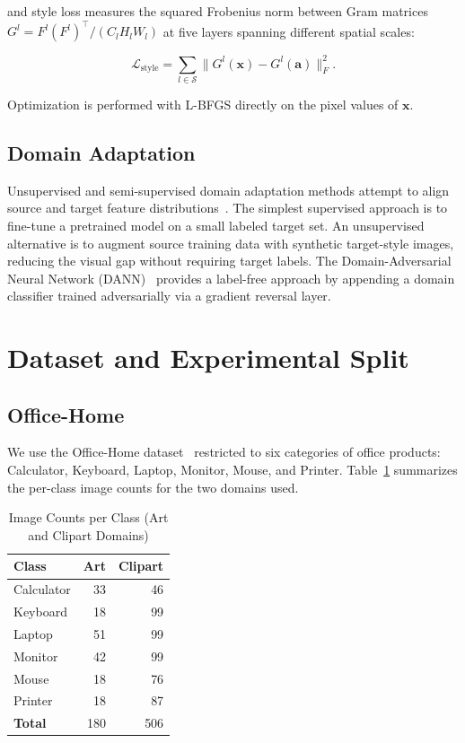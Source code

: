 \documentclass[conference]{IEEEtran}
\begin{document}
and style loss measures the squared Frobenius norm between Gram matrices
$G^l = F^l (F^l)^\top / (C_l H_l W_l)$ at five layers spanning different spatial scales:

\begin{equation}
  \mathcal{L}_{\text{style}} = \sum_{l \in \mathcal{S}}
  \bigl\lVert G^l(\mathbf{x}) - G^l(\mathbf{a}) \bigr\rVert_F^2.
  \label{eq:style_loss}
\end{equation}

Optimization is performed with L-BFGS directly on the pixel values of $\mathbf{x}$.

\subsection{Domain Adaptation}

Unsupervised and semi-supervised domain adaptation methods attempt to align source and
target feature distributions~\cite{zhuang2021transfer}.
The simplest supervised approach is to fine-tune a pretrained model on a small labeled
target set.
An unsupervised alternative is to augment source training data with synthetic target-style
images, reducing the visual gap without requiring target labels.
The Domain-Adversarial Neural Network (DANN)~\cite{ganin2016dann} provides a label-free
approach by appending a domain classifier trained adversarially via a gradient reversal layer.

\section{Dataset and Experimental Split}
\label{sec:data}

\subsection{Office-Home}

We use the Office-Home dataset~\cite{venkateswara2017officehome} restricted to six
categories of office products: Calculator, Keyboard, Laptop, Monitor, Mouse, and Printer.
Table~\ref{tab:dataset} summarizes the per-class image counts for the two domains used.

\begin{table}[h]
\centering
\caption{Image Counts per Class (Art and Clipart Domains)}
\label{tab:dataset}
\begin{tabular}{lrr}
\toprule
\textbf{Class} & \textbf{Art} & \textbf{Clipart} \\
\midrule
Calculator & 33  &  46 \\
Keyboard   & 18  &  99 \\
Laptop     & 51  &  99 \\
Monitor    & 42  &  99 \\
Mouse      & 18  &  76 \\
Printer    & 18  &  87 \\
\midrule
\textbf{Total} & 180 & 506 \\
\bottomrule
\end{tabular}
\end{table}
\end{document}
